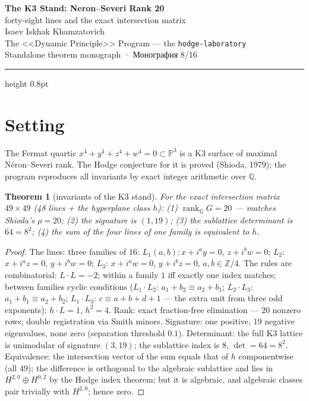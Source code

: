 \documentclass[11pt,a4paper]{article}
\theoremstyle{plain}
\newtheorem{theorem}{Theorem}
\theoremstyle{definition}
\theoremstyle{remark}
\newcommand{\ZZ}{\mathbb{Z}}
\newcommand{\QQ}{\mathbb{Q}}
\newcommand{\rank}{\operatorname{rank}}
\begin{document}
\begin{center}
{\LARGE\bfseries The K3 Stand: Neron–Severi Rank 20}\\[0.4em]
{\large forty-eight lines and the exact intersection matrix}\\[0.6em]
{\normalsize Isaev Iskhak Khamzatovich}\\[0.2em]
{\normalsize The <<Dynamic Principle>> Program --- the \texttt{hodge-laboratory}}\\[0.15em]
{\small Standalone theorem monograph · Монография 8/16}
\end{center}
\vspace{0.4em}
{\color{linkblue}\hrule height 0.8pt}
\vspace{0.8em}

\section{Setting}

The Fermat quartic $x^4+y^4+z^4+w^4=0\subset\mathbb{P}^3$ is a K3
surface of maximal N\'eron--Severi rank. The Hodge conjecture for it
is proved (Shioda, 1979); the program reproduces all invariants by
exact integer arithmetic over $\QQ$.

\begin{theorem}[invariants of the K3 stand]\label{th:k3stand}
For the exact intersection matrix $49\times49$ (48 lines + the
hyperplane class $h$): (1) $\rank_\QQ G=20$ --- matches Shioda's
$\rho=20$; (2) the signature is $(1,19)$; (3) the sublattice
determinant is $64=8^2$; (4) the sum of the four lines of one family
is equivalent to $h$.
\end{theorem}

\begin{proof}
The lines: three families of $16$: $L_1(a,b)\colon x+i^ay=0$,
$z+i^bw=0$; $L_2$: $x+i^az=0$, $y+i^bw=0$; $L_3$: $x+i^aw=0$,
$y+i^bz=0$, $a,b\in\ZZ/4$. The rules are combinatorial:
$L\cdot L=-2$; within a family $1$ iff exactly one index matches;
between families cyclic conditions ($L_1\cdot L_2$:
$a_1+b_2\equiv a_2+b_1$; $L_2\cdot L_3$: $a_1+b_1\equiv a_2+b_2$;
$L_1\cdot L_3$: $c\equiv a+b+d+1$ --- the extra unit from three odd
exponents); $h\cdot L=1$, $h^2=4$. Rank: exact fraction-free
elimination --- $20$ nonzero rows; double registration via Smith
minors. Signature: one positive, $19$ negative eigenvalues, none
zero (separation threshold $0.1$). Determinant: the full K3 lattice
is unimodular of signature $(3,19)$; the sublattice index is $8$,
$\det=64=8^2$. Equivalence: the intersection vector of the sum
equals that of $h$ componentwise (all $49$); the difference is
orthogonal to the algebraic sublattice and lies in
$H^{2,0}\oplus H^{0,2}$ by the Hodge index theorem; but it is
algebraic, and algebraic classes pair trivially with $H^{2,0}$;
hence zero.
\end{proof}
\end{document}
